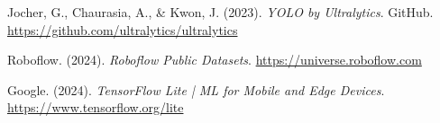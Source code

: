 \begin{thebibliography}{9}
Jocher, G., Chaurasia, A., \& Kwon, J. (2023). \textit{YOLO by Ultralytics}. GitHub. \url{https://github.com/ultralytics/ultralytics}

Roboflow. (2024). \textit{Roboflow Public Datasets}. \url{https://universe.roboflow.com}

Google. (2024). \textit{TensorFlow Lite | ML for Mobile and Edge Devices}. \url{https://www.tensorflow.org/lite}

\end{thebibliography}